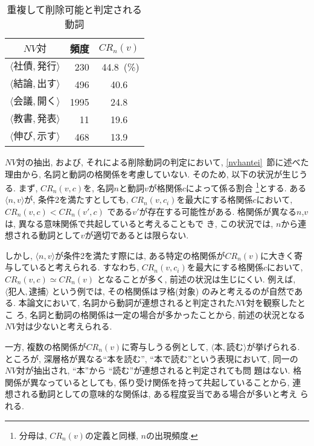 \begin{table}[hbtp]
\begin{center}
\caption{重複して削除可能と判定される動詞}
\label{chofuku}
\begin{tabular}{|crc|}
\hline
\multicolumn{1}{|c}{$NV対$}   & 頻度 & $CR_{n}(v)$\\
\hline \hline
$\langle 社債,発行\rangle$ & 230 & \multicolumn{1}{r|}{44.8\ (\%)}\\
$\langle 結論,出す\rangle$ & 496 & 40.6\\
$\langle 会議,開く\rangle$ & 1995 &  24.8\\
$\langle 教書,発表\rangle$ & 11 & 19.6\\
$\langle 伸び,示す\rangle$ & 468 & 13.9\\
\hline
\end{tabular}
\end{center}
\end{table}

$NV対$の抽出, および, それによる削除動詞の判定において,
\ref{nvhantei}~節に述べた理由から, 名詞と動詞の格関係を考慮していない. 
そのため, 以下の状況が生じうる.
まず, $CR_n(v,c)$を, 名詞$n$と動詞$v$が格関係$c$によって係る割合
\footnote{分母は, $CR_n(v)$の定義と同様, $n$の出現頻度.}とする.
ある$\langle n, v \rangle$が, 条件2を満たすとしても,
$CR_n(v,c_i)$を最大にする格関係$c$において, $CR_n(v,c) < CR_n(v',c)$
である$v'$が存在する可能性がある.
格関係が異なる$n$,$v$は, 異なる意味関係で共起していると考えることもで
き, この状況では, $n$から連想される動詞として$v$が適切であるとは限らない.

しかし, $\langle n, v \rangle$が条件2を満たす際には,
ある特定の格関係が$CR_n(v)$に大きく寄与していると考えられる.
すなわち, $CR_n(v,c_i)$を最大にする格関係$c$において, 
$CR_n(v,c) \simeq CR_n(v)$  となることが多く,
前述の状況は生じにくい.
例えば, $\langle 犯人, 逮捕 \rangle$ という例では, その格関係はヲ格(対象)
のみと考えるのが自然である.
本論文において, 名詞から動詞が連想されると判定された$NV対$を観察したとこ
ろ, 名詞と動詞の格関係は一定の場合が多かったことから,
前述の状況となる$NV対$は少ないと考えられる.

一方, 複数の格関係が$CR_n(v)$に寄与しうる例として, $\langle 本, 読む 
\rangle$が挙げられる. 
ところが, 深層格が異なる``本を読む'', ``本で読む''という表現において, 
同一の$NV$対が抽出され, ``本''から ``読む''が連想されると判定されても問
題はない. 
格関係が異なっているとしても, 係り受け関係を持って共起していることから, 
連想される動詞としての意味的な関係は, ある程度妥当である場合が多いと考え
られる.

